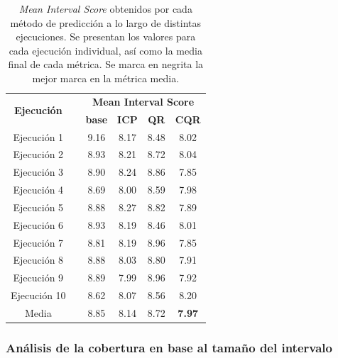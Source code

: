 \renewcommand{\arraystretch}{1.4}
\begin{table}[htbp]
    \small
    \centering
    \begin{tabular}{cccccc}
    \toprule
    \multirow{2}{*}{\textbf{Ejecución}} &  & \multicolumn{4}{c}{\textbf{Mean Interval Score}} \\ \cline{3-6} 
    &  & \textbf{base} & \textbf{ICP} & \textbf{QR} & \textbf{CQR} \\ \cline{1-1} \cline{3-6} 
    Ejecución  1 &  & 9.16 & 8.17 & 8.48 & 8.02 \\
    Ejecución  2 &  & 8.93 & 8.21 & 8.72 & 8.04 \\
    Ejecución  3 &  & 8.90 & 8.24 & 8.86 & 7.85 \\
    Ejecución  4 &  & 8.69 & 8.00 & 8.59 & 7.98 \\
    Ejecución  5 &  & 8.88 & 8.27 & 8.82 & 7.89 \\
    Ejecución  6 &  & 8.93 & 8.19 & 8.46 & 8.01 \\
    Ejecución  7 &  & 8.81 & 8.19 & 8.96 & 7.85 \\
    Ejecución  8 &  & 8.88 & 8.03 & 8.80 & 7.91 \\
    Ejecución  9 &  & 8.89 & 7.99 & 8.96 & 7.92 \\
    Ejecución 10 &  & 8.62 & 8.07 & 8.56 & 8.20 \\ \cline{1-1} \cline{3-6} 
    Media        &  & 8.85 & 8.14 & 8.72 & \textbf{7.97} \\ 
    \bottomrule
    \end{tabular}
    \caption[
        Problema de estimación de edad: 
        \textit{Mean Interval Score} obtenidos por cada método de predicción a lo largo de distintas ejecuciones. 
    ]{   
        \textit{Mean Interval Score} obtenidos por cada método de predicción a lo largo de distintas ejecuciones. Se presentan los valores para cada ejecución individual, así como la media final de cada métrica.
        Se marca en negrita la mejor marca en la métrica media.
    }
    \label{tab:AE_MIS_comparative}
\end{table}


\subsubsection{Análisis de la cobertura en base al tamaño del intervalo}

